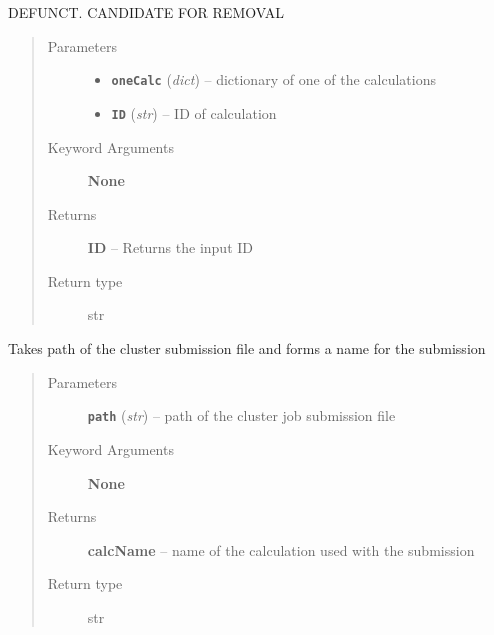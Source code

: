 \documentclass[letterpaper,10pt,english]{sphinxmanual}
\begin{document}

\begin{fulllineitems}
\label{run:run.__get_index_from_pp_step}
DEFUNCT. CANDIDATE FOR REMOVAL
\begin{quote}\begin{description}
\item[{Parameters}] \leavevmode\begin{itemize}
\item {} 
\textbf{\texttt{oneCalc}} (\emph{dict}) -- dictionary of one of the calculations

\item {} 
\textbf{\texttt{ID}} (\emph{str}) -- ID of calculation

\end{itemize}

\item[{Keyword Arguments}] \leavevmode
\textbf{None}

\item[{Returns}] \leavevmode
\textbf{ID} --
Returns the input ID

\item[{Return type}] \leavevmode
str

\end{description}\end{quote}

\end{fulllineitems}


\begin{fulllineitems}
\label{run:run.__get_qsub_name}
Takes path of the cluster submission file and forms a name for the submission
\begin{quote}\begin{description}
\item[{Parameters}] \leavevmode
\textbf{\texttt{path}} (\emph{str}) -- path of the cluster job submission file

\item[{Keyword Arguments}] \leavevmode
\textbf{None}

\item[{Returns}] \leavevmode
\textbf{calcName} --
name of the calculation used with the submission

\item[{Return type}] \leavevmode
str

\end{description}\end{quote}

\end{fulllineitems}
\end{document}
